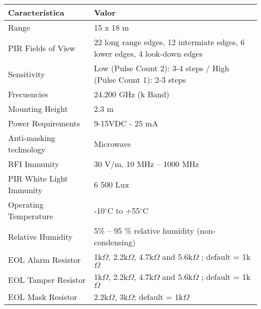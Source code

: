 
\begin{tabular}{p{}p{}}
  \hline
\textbf{Característica} & \textbf{Valor} \\
\hline
Range & 15 x 18 m\\
PIR Fields of View & 22 long range edges, 12 intermiate edges, 6 lower edges, 4 look-down edges \\
Sensitivity & Low (Pulse Count 2): 3-4 steps / High (Pulse Count 1): 2-3 steps\\
Frecuencies & 24.200 GHz (k Band) \\
Mounting Height & 2.3 m \\
Power Requirements & 9-15VDC - 25 mA \\
Anti-masking technology & Microwave \\
RFI Immunity & 30 V/m, 10 MHz – 1000 MHz \\
PIR White Light Immunity & 6 500 Lux \\
Operating Temperature & -10$^{\circ}$C to +55$^{\circ}$C \\
Relative Humidity & 5\% – 95 \% relative humidity (non-condensing) \\
\acs{EOL} Alarm Resistor & 1k$\Omega$, 2.2k$\Omega$, 4.7k$\Omega$ and 5.6k$\Omega$ ; default = 1k$\Omega$ \\
\acs{EOL} Tamper Resistor & 1k$\Omega$, 2.2k$\Omega$, 4.7k$\Omega$ and 5.6k$\Omega$ ; default = 1k$\Omega$ \\
\acs{EOL} Mask Resistor & 2.2k$\Omega$, 3k$\Omega$; default = 1k$\Omega$ \\ 
\hline
\end{tabular}
